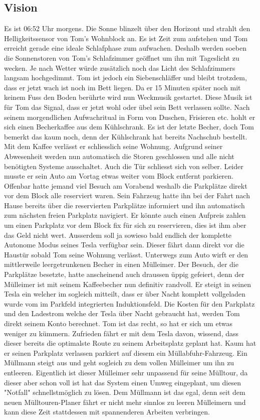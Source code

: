   \subsection{Vision}
  Es ist 06:52 Uhr morgens. Die Sonne blinzelt über den Horizont und strahlt den Helligkeitssensor von Tom's Wohnblock an. Es ist Zeit zum aufstehen und Tom erreicht gerade eine ideale Schlafphase zum aufwachen. Deshalb werden soeben die Sonnenstoren von Tom's Schlafzimmer geöffnet um ihn mit Tageslicht zu wecken. Je nach Wetter würde zusätzlich noch das Licht des Schlafzimmers langsam hochgedimmt. Tom ist jedoch ein Siebenschläffer und bleibt trotzdem, dass er jetzt wach ist noch im Bett liegen. Da er 15 Minuten später noch mit keinem Fuss den Boden berührte wird nun Weckmusik gestartet. Diese Musik ist für Tom das Signal, dass er jetzt wohl oder übel sein Bett verlassen sollte.  Nach seinem morgendlichen Aufwachritual in Form von Duschen, Frisieren etc. hohlt er sich einen Becherkaffee aus dem Kühlschrank. Es ist der letzte Becher, doch Tom bemerkt das kaum noch, denn der Kühlschrank hat bereits Nachschub bestellt. Mit dem Kaffee verlässt er schliesslich seine Wohnung. Aufgrund seiner Abwesenheit werden nun automatisch die Storen geschlossen und alle nicht benötigten Systeme ausschaltet. Auch die Tür schliesst sich von selber. Leider musste er sein Auto am Vortag etwas weiter vom Block entfernt parkieren. Offenbar hatte jemand viel Besuch am Vorabend weshalb die Parkplätze direkt vor dem Block alle reserviert waren. Sein Fahrzeug hatte ihn bei der Fahrt nach Hause bereits über die reservierten Parkplätze informiert und ihn automatisch zum nächsten freien Parkplatz navigiert. Er könnte auch einen Aufpreis zahlen um einen Parkplatz vor dem Block fix für sich zu reservieren, dies ist ihm aber das Geld nicht wert. Ausserdem soll ja sowieso bald endlich der komplette Autonome Modus seines Tesla verfügbar sein. Dieser fährt dann direkt vor die Haustür sobald Tom seine Wohnung verlässt. Unterwegs zum Auto wirft er den mittlerweile leergetrunkenen Becher in einen Mülleimer. Der Besuch, der die Parkplätze besetzte, hatte anscheinend auch draussen üppig gefeiert, denn der Mülleimer ist mit seinem Kaffeebecher nun definitiv randvoll. Er steigt in seinen Tesla ein welcher im sogleich mitteilt, dass er über Nacht komplett vollgeladen wurde vom im Parkfeld integrierten Induktionsfeld. Die Kosten für den Parkplatz und den Ladestrom welche der Tesla über Nacht gebraucht hat, werden Tom direkt seinem Konto berechnet. Tom ist das recht, so hat er sich um etwas weniger zu kümmern. Zufrieden fährt er mit dem Tesla davon, wissend, dass dieser bereits die optimalste Route zu seinem Arbeitsplatz geplant hat. Kaum hat er seinen Parkplatz verlassen parkiert auf diesem ein Müllabfuhr-Fahrzeug. Ein Müllmann steigt aus und geht sogleich zu dem vollen Mülleimer um ihn zu entleeren. Eigentlich ist dieser Mülleimer sehr unpassend für seine Mülltour, da dieser aber schon voll ist hat das System einen Umweg eingeplant, um diesen "Notfall" schnellstmöglich zu lösen. Dem Müllmann ist das egal, denn seit dem neuen Mülltouren-Planer fährt er nicht mehr sinnlos zu leeren Mülleimern und kann diese Zeit stattdessen mit spannenderen Arbeiten verbringen.
\fi